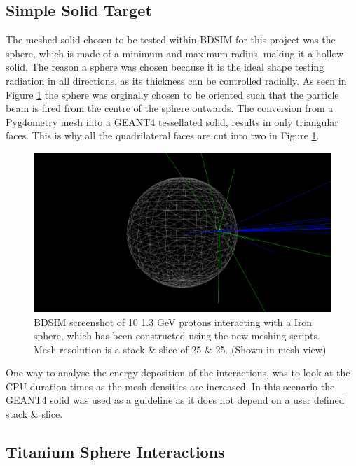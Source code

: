 \documentclass[12pt,a4paper]{article}
\begin{document}
\newpage
\subsection{Simple Solid Target}
The meshed solid chosen to be tested within BDSIM for this project was the sphere, which is made of a minimum and maximum radius, making it a hollow solid. The reason a sphere was chosen because it is the ideal shape testing radiation in all directions, as its thickness can be controlled radially. As seen in %
Figure \ref{sphbd} the sphere was orginally chosen to be oriented such that the particle beam is fired from the centre of the sphere outwards. The conversion from a Pyg4ometry mesh into a GEANT4 tessellated solid, results in only triangular faces. This is why all the quadrilateral faces are cut into two in Figure \ref{sphbd}.

\begin{figure}[h!]
\centering
\includegraphics[scale=0.35]{Images//BDSIM//ProtonSphere2.png}
\caption[width=\columnwidth]{BDSIM screenshot of 10 1.3 GeV protons interacting with a Iron sphere, which has been constructed using the new meshing scripts. Mesh resolution is a stack \& slice of 25 \& 25. (Shown in mesh view)}
\label{sphbd}
\end{figure}


\noindent One way to analyse the energy deposition of the interactions, was to look at the CPU duration times as the mesh densities are increased. In this scenario the GEANT4 solid was used as a guideline as it does not depend on a user defined stack \& slice. 


\subsection{Titanium Sphere Interactions}
\end{document}
